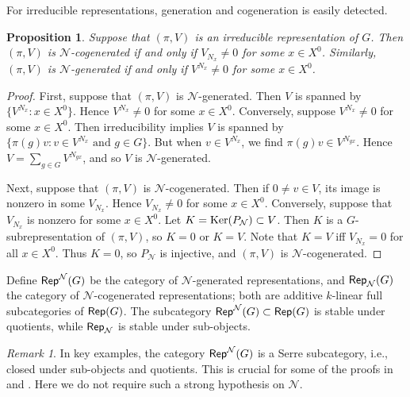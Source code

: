 \documentclass[letter]{amsart}
\newtheorem{proposition}[thm]{Proposition}
\theoremstyle{definition}
\newtheorem{definition}[thm]{Definition}
\theoremstyle{remark}
\newtheorem{remark}[thm]{Remark}
\numberwithin{thm}{section}
\numberwithin{equation}{section}
\renewcommand{\NN}{{\mathcal N}}
\DeclareMathOperator{\pr}{pr}
\begin{document}
For irreducible representations, generation and cogeneration is easily detected.
\begin{proposition}
Suppose that $(\pi, V)$ is an irreducible representation of $G$.  Then $(\pi, V)$ is $\NN$-cogenerated if and only if $V_{N_x} \neq 0$ for some $x \in X^0$.  Similarly, $(\pi, V)$ is $\NN$-generated if and only if $V^{N_x} \neq 0$ for some $x \in X^0$.
\end{proposition}
\begin{proof}
First, suppose that $(\pi, V)$ is $\NN$-generated.  Then $V$ is spanned by $\{ V^{N_x} : x \in X^0 \}$.  Hence $V^{N_x} \neq 0$ for some $x \in X^0$.  Conversely, suppose $V^{N_x} \neq 0$ for some $x \in X^0$.  Then irreducibility implies $V$ is spanned by $\{ \pi(g) v : v \in V^{N_x} \text{ and } g \in G \}$.  But when $v \in V^{N_x}$, we find $\pi(g) v \in V^{N_{gx}}$.  Hence $V = \sum_{g \in G} V^{N_{gx}}$, and so $V$ is $\NN$-generated.

Next, suppose that $(\pi, V)$ is $\NN$-cogenerated.  Then if $0 \neq v \in V$, its image is nonzero in some $V_{N_x}$.  Hence $V_{N_x} \neq 0$ for some $x \in X^0$.  Conversely, suppose that $V_{N_x}$ is nonzero for some $x \in X^0$.  Let $K = \Ker(P_\NN) \subset V$.  Then $K$ is a $G$-subrepresentation of $(\pi, V)$, so $K = 0$ or $K = V$.  Note that $K = V$ iff $V_{N_x} = 0$ for all $x \in X^0$.  Thus $K = 0$, so $P_\NN$ is injective, and $(\pi, V)$ is $\NN$-cogenerated.
\end{proof}

Define $\Cat{Rep}^\NN(G)$ be the category of $\NN$-generated representations, and $\Cat{Rep}_\NN(G)$ the category of $\NN$-cogenerated representations; both are additive $k$-linear full subcategories of ${\mathsf{Rep}}(G)$.  The subcategory $\Cat{Rep}^\NN(G) \subset \Cat{Rep}(G)$ is stable under quotients, while $\Cat{Rep}_\NN$ is stable under sub-objects.  

\begin{remark}
In key examples, the category $\Cat{Rep}^\NN(G)$ is a Serre subcategory, i.e., closed under sub-objects and quotients.  This is crucial for some of the proofs in \cite{MS} and \cite{BS}.  Here we do not require such a strong hypothesis on $\NN$.
\end{remark}
 
\end{document}
